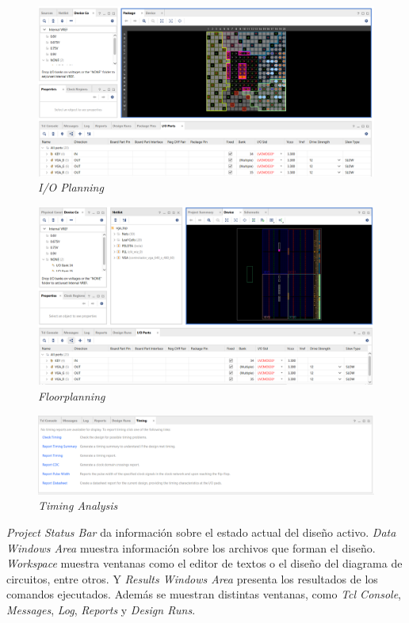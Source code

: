 \begin{figure}[H]
    \centering
    \includegraphics[width = 1\textwidth]{imagenes/io.png}
    \caption{\textit{I/O Planning}}\label{io}
\end{figure}

\begin{figure}[H]
    \centering
    \includegraphics[width = 1\textwidth]{imagenes/fp.png}
    \caption{\textit{Floorplanning}}\label{fp}
\end{figure}

\begin{figure}[H]
    \centering
    \includegraphics[width = 1\textwidth]{imagenes/ta.png}
    \caption{\textit{Timing Analysis}}\label{ta}
\end{figure}

\textit{Project Status Bar} da información sobre el estado actual del diseño activo. \textit{Data Windows Area} muestra información 
sobre los archivos que forman el diseño. \textit{Workspace} muestra ventanas como el editor de textos o el diseño del diagrama de 
circuitos, entre otros. Y \textit{Results Windows Area} presenta los resultados de los comandos ejecutados. Además se muestran 
distintas ventanas, como \textit{Tcl Console}, \textit{Messages}, \textit{Log}, \textit{Reports} y \textit{Design Runs}.

